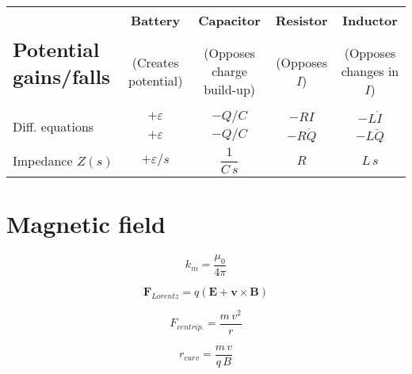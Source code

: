 \documentclass{form}
\begin{document}
\begin{center} \begin{tabular}{l | c | c | c | c} \hline \hline
	\multirow{2}{*}{\begin{minipage}[c]{0.25\textwidth}\subsection*{Potential gains/falls} \end{minipage}} & \textbf{Battery} & \textbf{Capacitor} & \textbf{Resistor} & \textbf{Inductor} \\
	& (Creates potential) & (Opposes charge build-up) & (Opposes $I$) & (Opposes changes in $I$)\\ \hline
	\multirow{2}{*}{Diff. equations} & $+\varepsilon$ & $-Q/C$ & $-RI$ & $-L\dot{I}$\\
	& $+\varepsilon$ & $-Q/C$ & $-R\dot{Q}$ & $-L\ddot{Q}$\\ \hline
	Impedance $Z(s)$ & $+\varepsilon/s$ & $\dfrac{1}{C\,s}$ & $R$ & $L\,s$ \\ \hline \hline
\end{tabular} \end{center}
\begin{minipage}[c]{0.12\textwidth}
	\section*{Magnetic field}
\end{minipage}
\begin{minipage}[c]{0.07\textwidth}
	\begin{equation*}
		k_m=\frac{\mu_0}{4\pi}
	\end{equation*}
\end{minipage}
\begin{minipage}[c]{0.21\textwidth}
	\begin{equation*}
		\mathbf{F}_{Lorentz}=q(\mathbf{E}+\mathbf{v}\times\mathbf{B})
	\end{equation*}
\end{minipage}
\begin{minipage}[c]{0.14\textwidth}
	\begin{equation*}
		F_{centrip.}=\frac{m\,v^2}{r}
	\end{equation*}
\end{minipage}
\begin{minipage}[c]{0.11\textwidth}
	\begin{equation*}
		r_{curv}=\dfrac{m\,v}{q\,B}
	\end{equation*}
\end{minipage}
\end{document}
